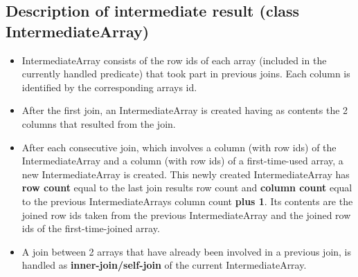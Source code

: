 \documentclass{ws-ijprai}
\begin{document}
\subsection{Description of intermediate result (class IntermediateArray)}
\begin{itemize}
    \item IntermediateArray consists of the row ids of each array (included in the currently handled predicate) that took part in previous joins. Each column is identified by the corresponding array\textquotesingle s id.
    \item After the first join, an IntermediateArray is created having as contents the 2 columns that resulted from the join.
    \item After each consecutive join, which involves a column (with row ids) of the IntermediateArray and a column (with row ids) of a first-time-used array, a new IntermediateArray is created. This newly created IntermediateArray has \textbf{row count} equal to the last join result\textquotesingle s row count and \textbf{column count} equal to the previous IntermediateArray\textquotesingle s column count \textbf{plus 1}. Its contents are the joined row ids taken from the previous IntermediateArray and the joined row ids of the first-time-joined array.
    \item A join between 2 arrays that have already been involved in a previous join, is handled as \textbf{inner-join/self-join} of the current IntermediateArray.

\end{itemize}
\end{document}
